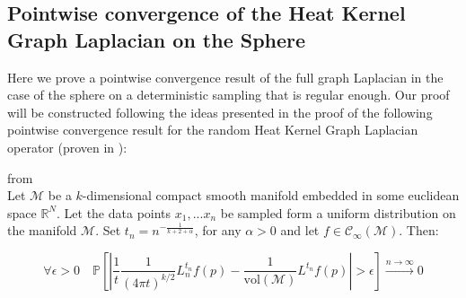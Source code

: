 \subsection{Pointwise convergence of the Heat Kernel Graph Laplacian on the Sphere}
\label{sec:pointwise convergence of the Heat Kernel Graph Laplacian on the Sphere}
Here we prove a pointwise convergence result of the full graph Laplacian in the case of the sphere on a deterministic sampling that is regular enough. Our proof will be constructed following the ideas presented in the proof of the following pointwise convergence result for the random Heat Kernel Graph Laplacian operator (proven in \cite{Belkin:2005:TTF:2138147.2138189}):
\vspace{0.5cm}
\begin{theorem}{from \cite[Belkin et al.]{Belkin:2005:TTF:2138147.2138189}}\\
	\label{theo:Belkin pointwise convergence}
	Let $\mathcal M$ be a $k$-dimensional compact smooth manifold embedded in some euclidean space $\mathbb R^N$. Let the data points $x_1, ... x_n$ be sampled form a uniform distribution on the manifold $\mathcal M$. Set $t_n=n^{-\frac{1}{k+2+\alpha}}$, for any $\alpha>0$ and let $f\in\mathcal C_\infty(\mathcal M)$. Then:
	
	$$\forall \epsilon>0\quad \mathbb{P}\left[\left|\frac{1}{t}\frac{1}{(4 \pi t)^{k/2}}L_{n}^{t_n} f(p)-  \frac{1}{\text{vol}(\mathcal M)}L^{t_n} f(p)\right|>\epsilon\right] \xrightarrow{n\to\infty} 0$$
\end{theorem}
\vspace{0.5cm}

